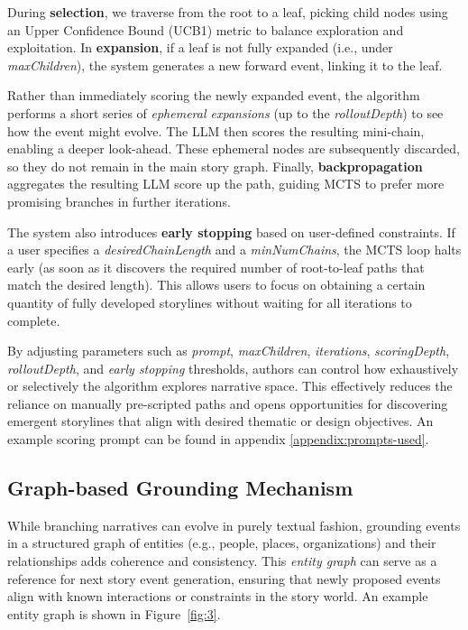 \documentclass[11pt]{article}
\begin{document}
During \textbf{selection}, we traverse from the root to a leaf, picking child nodes using an Upper Confidence Bound (UCB1) metric to balance exploration and exploitation. In \textbf{expansion}, if a leaf is not fully expanded (i.e., under \textit{maxChildren}), the system generates a new forward event, linking it to the leaf.

Rather than immediately scoring the newly expanded event, the algorithm performs a short series of \emph{ephemeral expansions} (up to the \textit{rolloutDepth}) to see how the event might evolve. The LLM then scores the resulting mini-chain, enabling a deeper look-ahead. These ephemeral nodes are subsequently discarded, so they do not remain in the main story graph. Finally, \textbf{backpropagation} aggregates the resulting LLM score up the path, guiding MCTS to prefer more promising branches in further iterations.

The system also introduces \textbf{early stopping} based on user-defined constraints. If a user specifies a \textit{desiredChainLength} and a \textit{minNumChains}, the MCTS loop halts early (as soon as it discovers the required number of root-to-leaf paths that match the desired length). This allows users to focus on obtaining a certain quantity of fully developed storylines without waiting for all iterations to complete.

By adjusting parameters such as \textit{prompt}, \textit{maxChildren}, \textit{iterations}, \textit{scoringDepth}, \textit{rolloutDepth}, and \textit{early stopping} thresholds, authors can control how exhaustively or selectively the algorithm explores narrative space. This effectively reduces the reliance on manually pre-scripted paths and opens opportunities for discovering emergent storylines that align with desired thematic or design objectives. An example scoring prompt can be found in appendix \ref{appendix:prompts-used}.

\subsection{Graph-based Grounding Mechanism}

While branching narratives can evolve in purely textual fashion, grounding events in a structured graph of entities (e.g., people, places, organizations) and their relationships adds coherence and consistency. This \emph{entity graph} can serve as a reference for next story event generation, ensuring that newly proposed events align with known interactions or constraints in the story world. An example entity graph is shown in Figure~\ref{fig:3}.
\end{document}
